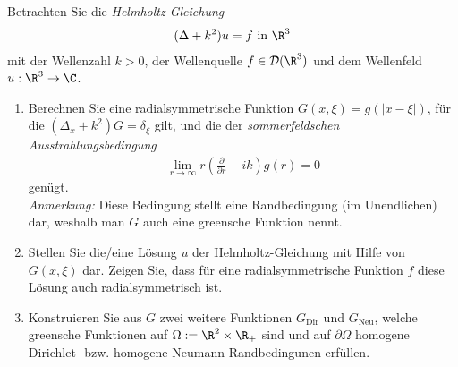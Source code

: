 
\begin{exercise}

Betrachten Sie die \textit{Helmholtz-Gleichung}
\begin{align*}
  (\Delta + k^2)u = f \text{ in } \R^3
\end{align*}
mit der Wellenzahl $k > 0$, der Wellenquelle $f \in \mathcal{D}(\R^3)$ und dem
Wellenfeld $u: \R^3 \to \C$.
\begin{enumerate}[label = (\roman*)]
  \item Berechnen Sie eine radialsymmetrische Funktion $G(x,\xi) = g(|x - \xi|)$,
  für die $(\Delta_x + k^2)G = \delta_\xi$ gilt, und die der \textit{sommerfeldschen
  Ausstrahlungsbedingung}
  \begin{align*}
    \lim_{r \to \infty}r\left(\frac{\partial}{\partial r} - ik\right)g(r) = 0
  \end{align*}
  genügt. \\
  \textit{Anmerkung:} Diese Bedingung stellt eine Randbedingung (im Unendlichen)
  dar, weshalb man $G$ auch eine greensche Funktion nennt.
  \item Stellen Sie die/eine Lösung $u$ der Helmholtz-Gleichung mit Hilfe von
  $G(x,\xi)$ dar. Zeigen Sie, dass für eine radialsymmetrische Funktion $f$ diese
  Lösung auch radialsymmetrisch ist.
  \item Konstruieren Sie aus $G$ zwei weitere Funktionen $G_{\mathrm{Dir}}$ und $G_{\mathrm{Neu}}$,
  welche greensche Funktionen auf $\Omega := \R^2 \times \R_+$ sind und auf $\partial\Omega$
  homogene Dirichlet- bzw. homogene Neumann-Randbedingunen erfüllen.
\end{enumerate}

\end{exercise}


\begin{solution}
\phantom{}
\end{solution}

